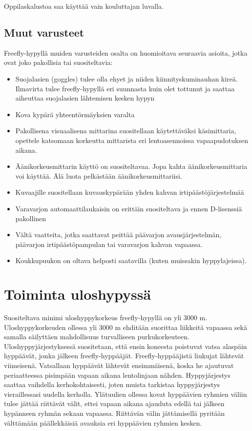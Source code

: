 Oppilaskalustoa saa käyttää vain kouluttajan luvalla. 

\subsection{ Muut varusteet }
\label{turvallisuus-freehyppaamisessa-muut-varusteet}


Freefly-hypyllä muiden varusteiden osalta on huomioitava seuraavia asioita, jotka ovat joko pakollisia tai suositeltavia: 

\begin{itemize}
\item  Suojalasien (goggles) tulee olla ehyet ja niiden kiinnityskuminauhan kireä. Ilmavirta tulee freefly-hypyllä eri suunnasta kuin olet tottunut ja saattaa aiheuttaa suojalasien lähtemisen kesken hypyn 
\item  Kova kypärä yhteentörmäyksien varalta 
\item  Pakollisena visuaalisena mittarina suositellaan käytettäväksi käsimittaria, opettele katsomaan korkeutta mittarista eri lentoasennoissa vapaapudotuksen aikana. 
\item  Äänikorkeusmittarin käyttö on suositeltavaa. Jopa kahta äänikorkeusmittaria voi käyttää. Älä luota pelkästään äänikorkeusmittariisi. 
\item  Kuvaajille suositellaan kuvauskypärään yhden kahvan irtipäästöjärjestelmää 
\item  Varavarjon automaattilaukaisin on erittäin suositeltava ja ennen D-lisenssiä pakollinen 
\item  Vältä vaatteita, jotka saattavat peittää päävarjon avausjärjestelmän, päävarjon irtipäästöpampulan tai varavarjon kahvan vapaassa. 
\item  Koukkupuukon on oltava helposti saatavilla (kuten muissakin hyppylajeissa). 
\end{itemize}
\section{ Toiminta uloshypyssä }
\label{turvallisuus-freehyppaamisessa-toiminta-uloshypyssa}


Suositeltava minimi uloshyppykorkeus freefly-hypyllä on yli 3000 m. Uloshyppykorkeuden ollessa yli 3000 m ehditään suorittaa liikkeitä vapaassa sekä samalla säilyttäen mahdollisuus turvalliseen purkukorkeuteen. Uloshyppyjärjestyksessä suositetaan, että ensin koneesta poistuvat vatsa alaspäin hyppäävät, jonka jälkeen freefly-hyppääjät. Freefly-hyppääjistä liukujat lähtevät viimeisenä. Vatsallaan hyppäävät lähtevät ensimmäisenä, koska he ajautuvat periaatteessa pisimpään vapaan aikana lentolinjaan nähden. Hyppyjärjestys saattaa vaihdella kerhokohtaisesti, joten muista tarkistaa hyppyjärjestys vieraillessasi uudella kerholla. Ylätuulien ollessa kovat hyppäävien ryhmien väliin tulee jättää riittävät välit, ettei vapaan aikana ajauduta edellä tai jälkeen hypänneen ryhmän sekaan vapaassa. Riittävän välin jättämisellä pyritään välttämään päällekkäisiä avauksia eri hyppäävien ryhmien kesken. 


